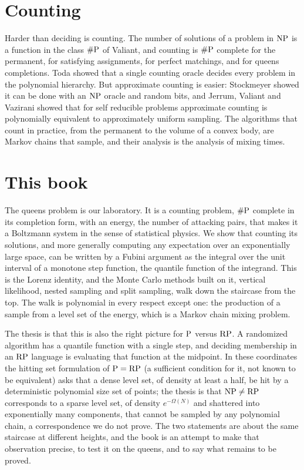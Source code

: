 \section{Counting}

Harder than deciding is counting. The number of solutions of a problem in $\mathrm{NP}$ is a function in the class $\#\mathrm{P}$ of Valiant, and counting is $\#\mathrm{P}$ complete for the permanent, for satisfying assignments, for perfect matchings, and for queens completions. Toda showed that a single counting oracle decides every problem in the polynomial hierarchy. But approximate counting is easier: Stockmeyer showed it can be done with an $\mathrm{NP}$ oracle and random bits, and Jerrum, Valiant and Vazirani showed that for self reducible problems approximate counting is polynomially equivalent to approximately uniform sampling. The algorithms that count in practice, from the permanent to the volume of a convex body, are Markov chains that sample, and their analysis is the analysis of mixing times.

\section{This book}

The queens problem is our laboratory. It is a counting problem, $\#\mathrm{P}$ complete in its completion form, with an energy, the number of attacking pairs, that makes it a Boltzmann system in the sense of statistical physics. We show that counting its solutions, and more generally computing any expectation over an exponentially large space, can be written by a Fubini argument as the integral over the unit interval of a monotone step function, the quantile function of the integrand. This is the Lorenz identity, and the Monte Carlo methods built on it, vertical likelihood, nested sampling and split sampling, walk down the staircase from the top. The walk is polynomial in every respect except one: the production of a sample from a level set of the energy, which is a Markov chain mixing problem.

The thesis is that this is also the right picture for $\mathrm{P}$ versus $\mathrm{RP}$. A randomized algorithm has a quantile function with a single step, and deciding membership in an $\mathrm{RP}$ language is evaluating that function at the midpoint. In these coordinates the hitting set formulation of $\mathrm{P} = \mathrm{RP}$ (a sufficient condition for it, not known to be equivalent) asks that a dense level set, of density at least a half, be hit by a deterministic polynomial size set of points; the thesis is that $\mathrm{NP} \neq \mathrm{RP}$ corresponds to a sparse level set, of density $e^{-\Omega(N)}$ and shattered into exponentially many components, that cannot be sampled by any polynomial chain, a correspondence we do not prove. The two statements are about the same staircase at different heights, and the book is an attempt to make that observation precise, to test it on the queens, and to say what remains to be proved.

